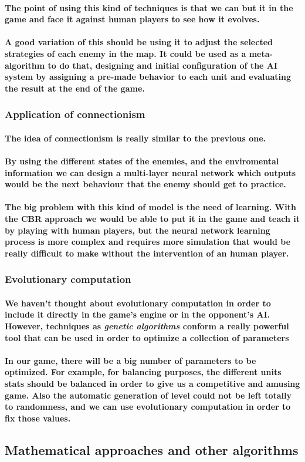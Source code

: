 \documentclass[a4paper,10pt]{article}
\newcommand{\p}[1]{\paragraph{\indent\textnormal{#1}}}
\begin{document}
    \p{The point of using this kind of techniques is that we can but it in the game and face it against human players to see how it evolves.}

     \p{A good variation of this should be using it to adjust the selected strategies of each enemy in the map. It could be used as a \textbf{meta-algorithm} to do that, designing and initial configuration of the AI system by assigning a pre-made behavior to each unit and evaluating the result at the end of the game.}

  \subsubsection{Application of connectionism}

      \p{The idea of connectionism is really similar to the previous one.}

      \p{By using the different states of the enemies, and the enviromental information we can design a multi-layer neural network which outputs would be the next behaviour that the enemy should get to practice.}

      \p{The big problem with this kind of model is the need of learning. With the \textbf{CBR approach} we would be able to put it in the game and teach it by playing with human players, but the \textbf{neural network} learning process is \textbf{more complex} and requires more simulation that would be really \textbf{difficult to make} without the intervention of an human player.}

  \subsubsection{Evolutionary computation}
  
  \p{We haven't thought about evolutionary computation in order to include it directly in the game's engine or in the opponent's AI. However, techniques as \textit{genetic algorithms} conform a really powerful tool that can be used in order to optimize a collection of parameters}

  \p{In our game, there will be a big number of parameters to be optimized. For example, for balancing purposes, the different units stats should be balanced in order to give us a competitive and amusing game. Also the automatic generation of level could not be left totally to randomness, and we can use evolutionary computation in order to fix those values.}

  \subsection{Mathematical approaches and other algorithms}
\end{document}
